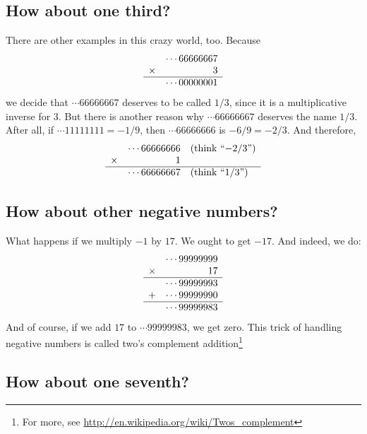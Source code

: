 \documentclass[11pt]{article}
\begin{document}
\subsection*{How about one third?}

There are other examples in this crazy world, too.  Because
$$
\begin{array}{cr}
       & \cdots 66666667 \\
\times & 3 \\
\hline
 & \cdots 00000001
\end{array}
$$
we decide that $\cdots 66666667$ deserves to be called $1/3$, since it
is a multiplicative inverse for $3$.  But there is another reason why
$\cdots 66666667$ deserves the name $1/3$.  After all, if $\cdots
11111111 = -1/9$, then $\cdots 66666666$ is $-6/9 = -2/3$.  And
therefore,
$$
\begin{array}{crl}
       & \cdots 66666666 & \mbox{(think ``$-2/3$'')}\\
\times & 1 \\
\hline
 & \cdots 66666667 & \mbox{(think ``$1/3$'')}
\end{array}
$$

\subsection*{How about other negative numbers?}

What happens if we multiply $-1$ by $17$.  We ought to get $-17$.  And
indeed, we do:
$$
\begin{array}{cr}
       & \cdots 99999999 \\
\times & 17 \\
\hline
  & \cdots 99999993 \\
+ & \cdots 99999990 \\
\hline
 & \cdots  99999983
\end{array}
$$
And of course, if we add $17$ to $\cdots 99999983$, we get zero.  This
trick of handling negative numbers is called two's complement
addition\footnote{For more, see \url{http://en.wikipedia.org/wiki/Twos_complement}}

\subsection*{How about one seventh?}
\end{document}
